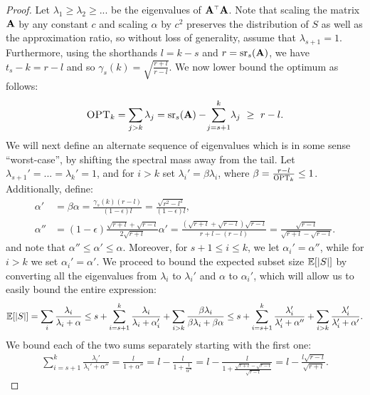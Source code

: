 \documentclass{article}
\begin{document}
\begin{proof}
  Let $\lambda_1\geq \lambda_2\geq ...$ be the eigenvalues of
  $\A^\top\A$. Note that scaling the matrix $\mathbf A$ by any constant $c$ and
  scaling $\alpha$ by $c^2$ preserves the distribution of $S$ as well
  as the approximation ratio, so without loss of generality, assume
  that $\lambda_{s+1}=1$. Furthermore, using the shorthands
    $l=k-s$ and $r={\mathrm{sr}}_s(\mathbf A)$, we have $t_s-k=r-l$ and so
    $\gamma_s(k)=\sqrt{\tfrac{r+l}{r-l}}$. We now lower bound the optimum as follows:
  \begin{align*}
{\textsc{OPT}_k} = \sum_{j>k}\lambda_j = {\mathrm{sr}}_s(\mathbf A) - \!\sum_{j=s+1}^k\!\lambda_j\
    \geq\  r-l.
  \end{align*}
  We will next define an alternate sequence of eigenvalues which is in
  some sense ``worst-case'', by shifting the spectral mass away from
  the tail. 
  Let $\lambda_{s+1}'=...=\lambda_{k}'=1$, and for $i>k$ set
    $\lambda_i'=\beta\lambda_i$, where $\beta =
    \frac{r-l}{{\textsc{OPT}_k}}\leq 1$. Additionally, define:
\begin{align}\alpha'&=\beta\alpha=\frac{\gamma_s(k)(r-l)}{(1-\epsilon)l} =
  \frac{\sqrt{r^2-l^2}}{(1-\epsilon)l},\nonumber\\
  \alpha''&=(1-\epsilon)\frac{\sqrt{r+l}+\sqrt{r-l}}{2\sqrt{r+l}}\alpha'
=\frac{(\sqrt{r+l}+\sqrt{r-l})\sqrt{r-l}}{r+l-(r-l)}=\frac{\sqrt{r-l}}{\sqrt{r+l}-\sqrt{r-l}}.
            \label{eq:alpha}
  \end{align}
and note that $\alpha''\leq\alpha'\leq \alpha$. Moreover, for $s+1\leq i\leq k$,
we let $\alpha_i'=\alpha''$, while for $i>k$ we set $\alpha_i'=\alpha'$.
We proceed to bound the expected subset size $\mathbb E[|S|]$ by converting
all the eigenvalues from $\lambda_i$ to $\lambda_i'$ and $\alpha$ to
$\alpha_i'$, which will allow us to easily bound the entire expression:
  \begin{align}
    \mathbb E[|S|] = \sum_{i}\frac{\lambda_i}{\lambda_i+\alpha} 
\leq s + \sum_{i=s+1}^{k}\frac{\lambda_i}{\lambda_i+\alpha_i'}
    + \sum_{i>k}\frac{\beta\lambda_i}{\beta\lambda_i+\beta\alpha}
    \leq s + \sum_{i=s+1}^k  \frac{\lambda_i'}{\lambda_i'+\alpha''} +
    \sum_{i>k}\frac{\lambda_i'}{\lambda_i'+\alpha'}.\label{eq:converting}
  \end{align}
  We bound each of the two sums separately starting with the first one:
  \begin{align}
    \sum_{i=s+1}^k  \frac{\lambda_i'}{\lambda_i'+\alpha''}
    =\frac l{1+\alpha''} = l- \frac {l}{1+\frac1{\alpha''}} =
    l-\frac{l}{1+\frac{\sqrt{r+l}-\sqrt{r-l}}{\sqrt{r-l}}} = l - \frac{l\sqrt{r-l}}{\sqrt{r+l}}.\label{eq:sum1}

\end{align}
\end{proof}
\end{document}
